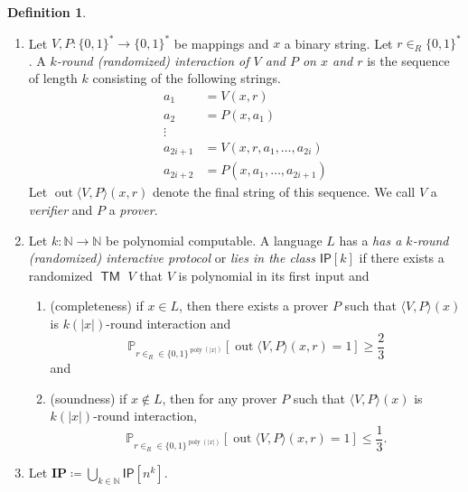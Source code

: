\documentclass[10pt,letterpaper,cm]{nupset}
\theoremstyle{definition}
\newtheorem{definition}{Definition}[subsection]
\theoremstyle{theorem}
\theoremstyle{remark}
\newcommand{\N}{\mathbb N}
\newcommand{\1}{\mathbf{1}}
\newcommand{\0}{\vec 0}
\DeclareMathOperator{\out}{out}
\DeclareMathOperator{\TM}{\mathsf{TM}}
\DeclareMathOperator{\poly}{poly}
\begin{document}
\begin{definition} $ $
\begin{enumerate}
\item  Let $V, P: \{0,1\}^{\ast} \to \{0,1\}^{\ast}$ be mappings and $x$ a binary string. Let $r\in_R \{0,1\}^{\ast}$. A \textit{$k$-round (randomized) interaction of $V$ and $P$ on $x$ and $r$} is the sequence of length $k$  consisting of the following strings.
\[
\begin{aligned} a_{1} &=V(x, r) \\ a_{2} &=P\left(x, a_{1}\right) \\ \vdots & \\ a_{2 i+1} &=V\left(x,r, a_{1}, \ldots, a_{2 i}\right) \\ a_{2 i+2} &=P\left(x, a_{1}, \ldots, a_{2 i+1}\right) \end{aligned}
\] Let $\out{\langle V, P\rangle (x, r)}$ denote the final string of this sequence. We call $V$ a \textit{verifier} and $P$ a \textit{prover}.
\item Let $k : \N \to \N$ be polynomial computable. A language $L$ has a \textit{has a $k$-round (randomized) interactive protocol} or \textit{lies in the class $\mathsf{IP}[k]$} if there exists a randomized $\TM$ $V$ that $V$ is polynomial in its first input and
\begin{enumerate}
\item (completeness) if $x\in L$, then there exists a prover $P$ such that $\langle V, P\rangle(x)$ is $k(|x|)$-round interaction and $$\mathbb{P}_{r\in_R \in \{0,1\}^{\poly(\lvert{x}\rvert)}}[\out{\langle V, P\rangle(x, r)} =1] \geq \frac{2}{3}$$ and 
\item (soundness) if $x\notin L$, then for any prover $P$ such that $\langle V, P\rangle(x)$ is $k(|x|)$-round interaction, $$\mathbb{P}_{r\in_R \in \{0,1\}^{\poly(\lvert{x}\rvert)}}[\out{\langle V, P\rangle(x, r)} =1] \leq \frac{1}{3}.$$
\end{enumerate}
\item Let $\mathbf{IP} \coloneqq \bigcup_{k\in \N}\mathsf{IP}[n^k]$.
\end{enumerate}
\end{definition}
\end{document}

